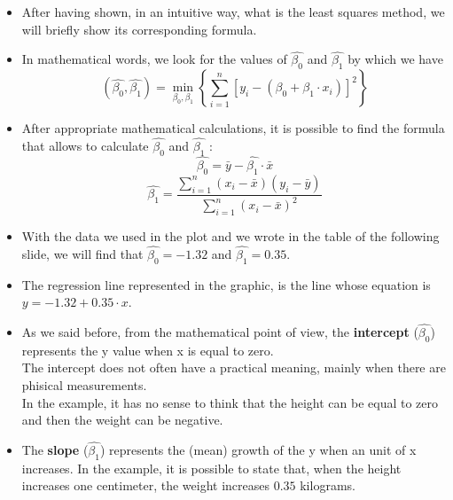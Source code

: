 \begin{frame}
  \vspace{0.25cm}
  \begin{itemize}
    \item After having shown, in an intuitive way, what is the least squares method, we will briefly show its corresponding formula.
    \vspace{0.15cm}
    \item In mathematical words, we look for the values of $ \hat{\beta_0} $ and $ \hat{\beta_1} $ by which we have
      \vspace{-0.3cm} $$ (\hat{\beta_0}, \hat{\beta_1}) = \min_{\beta_0, \beta_1}\left\lbrace \sum_{i=1}^{n}{\left[ y_i-\left(\beta_0 + \beta_1 \cdot x_i \right) \right] ^2 }\right\rbrace $$ \vspace{-0.4cm}
    \vspace{0.15cm}
    \item After appropriate mathematical calculations, it is possible to find the formula that allows to calculate $ \hat{\beta_0} $ and $ \hat{\beta_1} $ :
      \vspace{-0.2cm} $$ \hat{\beta_0} = \bar{y} - \hat{\beta_1} \cdot \bar{x} $$
      $$ \hat{\beta_1} = \frac{\sum_{i=1}^n (x_i - \bar{x}) (y_i - \bar{y})}{\sum_{i=1}^n (x_i - \bar{x})^2} $$
  \end{itemize}
\end{frame}

\begin{frame}[label=stimaMQ]
  \begin{itemize}
    \item With the data we used in the plot and we wrote in the table of the following slide, we will find that  $ \hat{\beta_0} = -1.32 $ and $ \hat{\beta_1} = 0.35 $.
    \item The regression line represented in the graphic, is the line whose equation is $ y = -1.32 + 0.35 \cdot x $.
    \item As we said before, from the mathematical point of view, the \textbf{intercept} ($ \hat{\beta_0} $) represents the y value when x is equal to zero. \\ 
      The intercept does not often have a practical meaning, mainly when there are phisical measurements. \\
      In the example, it has no sense to think that the height can be equal to zero and then the weight can be negative.
    \item The \textbf{slope} ($ \hat{\beta_1} $) represents the (mean) growth of the y when an unit of x increases. In the example, it is possible to state that, when the height increases one centimeter, the weight increases $ 0.35 $ kilograms.
  \end{itemize}
\end{frame}

